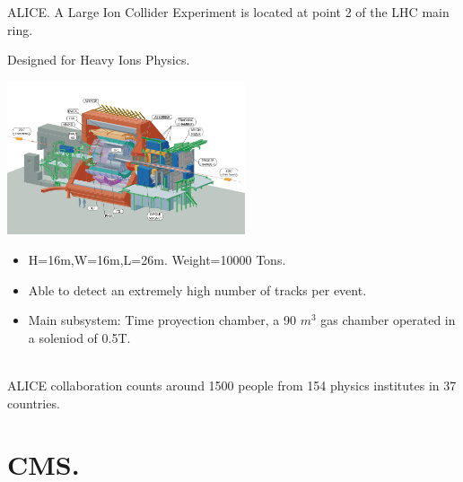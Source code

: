 \documentclass[8pt]{beamer}
\begin{document}
\begin{frame}[fragile]{ALICE.}
A Large Ion Collider Experiment is located at point 2 of the LHC main ring.

Designed for Heavy Ions Physics.
\\
\begin{minipage}{0.7\textwidth}%
\includegraphics[width=7cm]{6}
\end{minipage}%
\hfill%
\begin{minipage}{0.3\textwidth}\raggedleft
	\begin{itemize}
		\item H=16m,W=16m,L=26m. Weight=10000 Tons.	
		\item Able to detect an extremely high number of tracks per event.
		\item Main subsystem: Time proyection chamber, a 90 $m^3$ gas chamber operated in a soleniod of 0.5T.
	\end{itemize}
\end{minipage}
\\
ALICE collaboration counts around 1500 people from 154 physics institutes in 37 countries.
\end{frame}


\section{CMS.}
\end{document}
